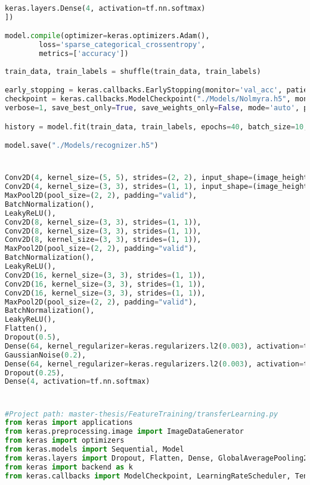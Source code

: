 \begin{appendices}
\begin{lstlisting}[language=python]
	keras.layers.Dense(4, activation=tf.nn.softmax)
])

model.compile(optimizer=keras.optimizers.Adam(),
	    loss='sparse_categorical_crossentropy',
	    metrics=['accuracy'])
	    
train_data, train_labels = shuffle(train_data, train_labels)

early_stopping = keras.callbacks.EarlyStopping(monitor='val_acc', patience=5, verbose=1)
checkpoint = keras.callbacks.ModelCheckpoint("./Models/Nolmyra.h5", monitor='val_acc', 
verbose=1, save_best_only=True, save_weights_only=False, mode='auto', period=1)

history = model.fit(train_data, train_labels, epochs=40, batch_size=10, validation_data=(test_images, test_labels), callbacks=[early_stopping, checkpoint] , verbose=1)

model.save("./Models/recognizer.h5")
\end{lstlisting}

\section{}
\begin{lstlisting}[language=python]
Conv2D(4, kernel_size=(5, 5), strides=(2, 2), input_shape=(image_height, image_width, number_of_color_channels)),
Conv2D(4, kernel_size=(3, 3), strides=(1, 1), input_shape=(image_height, image_width, number_of_color_channels)),
MaxPool2D(pool_size=(2, 2), padding="valid"),
BatchNormalization(),
LeakyReLU(),
Conv2D(8, kernel_size=(3, 3), strides=(1, 1)),
Conv2D(8, kernel_size=(3, 3), strides=(1, 1)),
Conv2D(8, kernel_size=(3, 3), strides=(1, 1)),
MaxPool2D(pool_size=(2, 2), padding="valid"),
BatchNormalization(),
LeakyReLU(),
Conv2D(16, kernel_size=(3, 3), strides=(1, 1)),
Conv2D(16, kernel_size=(3, 3), strides=(1, 1)),
Conv2D(16, kernel_size=(3, 3), strides=(1, 1)),
MaxPool2D(pool_size=(2, 2), padding="valid"),
BatchNormalization(),
LeakyReLU(),
Flatten(),
Dropout(0.5),
Dense(64, kernel_regularizer=keras.regularizers.l2(0.003), activation=tf.nn.relu),
GaussianNoise(0.2),
Dense(64, kernel_regularizer=keras.regularizers.l2(0.003), activation=tf.nn.relu),
Dropout(0.25),
Dense(4, activation=tf.nn.softmax)
\end{lstlisting}

\section{}
 \begin{lstlisting}[language=python]
#Project path: master-thesis/FeatureTraining/transferLearning.py
from keras import applications
from keras.preprocessing.image import ImageDataGenerator
from keras import optimizers
from keras.models import Sequential, Model
from keras.layers import Dropout, Flatten, Dense, GlobalAveragePooling2D, Input, Conv2D, MaxPool2D
from keras import backend as k
from keras.callbacks import ModelCheckpoint, LearningRateScheduler, TensorBoard, EarlyStopping


\end{lstlisting}
\end{appendices}
